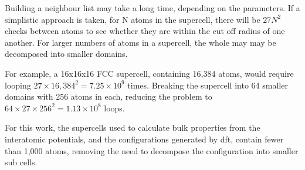 Building a neighbour list may take a long time, depending on the parameters.  If a simplistic approach is taken, for N atoms in the supercell, there will be $27N^2$ checks between atoms to see whether they are within the cut off radius of one another.  For larger numbers of atoms in a supercell, the whole may may be decomposed into smaller domains.

For example, a 16x16x16 FCC supercell, containing 16,384 atoms, would require looping $27 \times 16,384^2 = 7.25 \times 10^9$ times.  Breaking the supercell into 64 smaller domains with 256 atoms in each, reducing the problem to $64 \times 27 \times 256^2 = 1.13 \times 10^8$ loops.

For this work, the supercells used to calculate bulk properties from the interatomic potentials, and the configurations generated by \acrshort{dft}, contain fewer than 1,000 atoms, removing the need to decompose the configuration into smaller sub cells.


